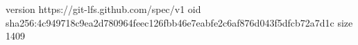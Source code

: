 version https://git-lfs.github.com/spec/v1
oid sha256:4c949718c9ea2d780964feec126fbb46e7eabfe2c6af876d043f5dfcb72a7d1c
size 1409
